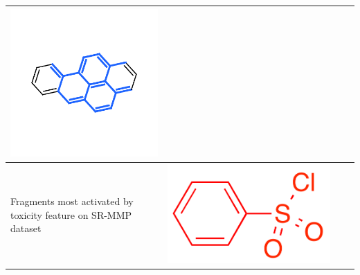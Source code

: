 \documentclass[landscape,a0b,final,a4resizeable]{include/a0poster}
\begin{document}
\begin{poster}
\begin{multicols}{3}
\begin{center}
\begin{tabular}{>{\centering}m{\mywidthb} >{\centering}m{\mywidtha} >{\centering}m{\mywidtha} >{\centering\arraybackslash}m{\mywidtha}}
\includegraphics[width=\mywidtha, clip, trim = 2mm 3mm 2mm 6mm]{figures/fig_10.pdf}\vspace{-1em} \\
\midrule
Fragments most activated by toxicity feature on SR-MMP dataset
& \includegraphics[width=\mywidtha]{figures/jorge-figures/7.png} 

\end{tabular}
\end{center}
\end{multicols}
\end{poster}
\end{document}
